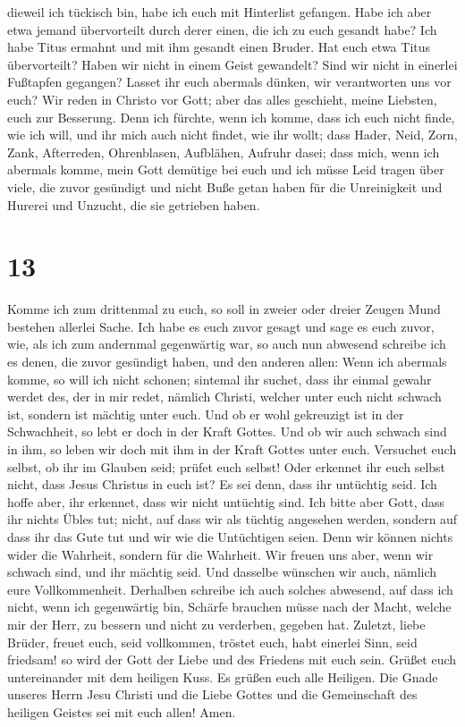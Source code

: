 dieweil ich tückisch bin, habe ich euch mit Hinterlist gefangen.
 Habe ich aber etwa jemand übervorteilt durch derer
einen, die ich zu euch gesandt habe?  Ich habe Titus
ermahnt und mit ihm gesandt einen Bruder. Hat euch etwa Titus
übervorteilt? Haben wir nicht in einem Geist gewandelt? Sind wir nicht
in einerlei Fußtapfen gegangen?  Lasset ihr euch abermals
dünken, wir verantworten uns vor euch? Wir reden in Christo vor Gott;
aber das alles geschieht, meine Liebsten, euch zur Besserung.
 Denn ich fürchte, wenn ich komme, dass ich euch nicht
finde, wie ich will, und ihr mich auch nicht findet, wie ihr wollt; dass
Hader, Neid, Zorn, Zank, Afterreden, Ohrenblasen, Aufblähen, Aufruhr
dasei;  dass mich, wenn ich abermals komme, mein Gott
demütige bei euch und ich müsse Leid tragen über viele, die zuvor
gesündigt und nicht Buße getan haben für die Unreinigkeit und Hurerei
und Unzucht, die sie getrieben haben.

\hypertarget{section-12}{%
\section{13}\label{section-12}}

 Komme ich zum drittenmal zu euch, so soll in zweier oder
dreier Zeugen Mund bestehen allerlei Sache.  Ich habe es
euch zuvor gesagt und sage es euch zuvor, wie, als ich zum andernmal
gegenwärtig war, so auch nun abwesend schreibe ich es denen, die zuvor
gesündigt haben, und den anderen allen: Wenn ich abermals komme, so will
ich nicht schonen;  sintemal ihr suchet, dass ihr einmal
gewahr werdet des, der in mir redet, nämlich Christi, welcher unter euch
nicht schwach ist, sondern ist mächtig unter euch.  Und ob
er wohl gekreuzigt ist in der Schwachheit, so lebt er doch in der Kraft
Gottes. Und ob wir auch schwach sind in ihm, so leben wir doch mit ihm
in der Kraft Gottes unter euch.  Versuchet euch selbst, ob
ihr im Glauben seid; prüfet euch selbst! Oder erkennet ihr euch selbst
nicht, dass Jesus Christus in euch ist? Es sei denn, dass ihr untüchtig
seid.  Ich hoffe aber, ihr erkennet, dass wir nicht
untüchtig sind.  Ich bitte aber Gott, dass ihr nichts
Übles tut; nicht, auf dass wir als tüchtig angesehen werden, sondern auf
dass ihr das Gute tut und wir wie die Untüchtigen seien. 
Denn wir können nichts wider die Wahrheit, sondern für die Wahrheit.
 Wir freuen uns aber, wenn wir schwach sind, und ihr
mächtig seid. Und dasselbe wünschen wir auch, nämlich eure
Vollkommenheit.  Derhalben schreibe ich auch solches
abwesend, auf dass ich nicht, wenn ich gegenwärtig bin, Schärfe brauchen
müsse nach der Macht, welche mir der Herr, zu bessern und nicht zu
verderben, gegeben hat.  Zuletzt, liebe Brüder, freuet
euch, seid vollkommen, tröstet euch, habt einerlei Sinn, seid friedsam!
so wird der Gott der Liebe und des Friedens mit euch sein.
 Grüßet euch untereinander mit dem heiligen Kuss. Es
grüßen euch alle Heiligen.  Die Gnade unseres Herrn Jesu
Christi und die Liebe Gottes und die Gemeinschaft des heiligen Geistes
sei mit euch allen! Amen.
